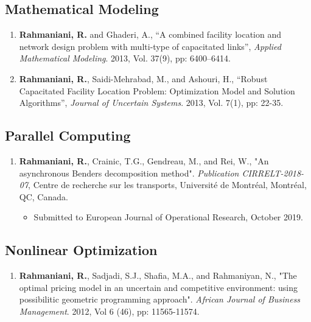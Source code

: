 \documentclass[10PT,letter]{article}
\newcommand{\subsectionstyle}[1]{\normalfont\selectfont\textcolor{titlecol}{\sffamily #1}}
\begin{document}
		\subsection*{\subsectionstyle{Mathematical Modeling}}
			\begin{enumerate}[itemsep=.5mm]
           		 \item 
           		 			\textbf{Rahmaniani, R.} and Ghaderi, A., “A combined facility location and network design problem with multi-type of capacitated links”, \textit{Applied Mathematical Modeling}. 2013, Vol. 37(9), pp: 6400–6414.	
           		 \item
           		 			\textbf{Rahmaniani, R.}, Saidi-Mehrabad, M., and Ashouri, H., “Robust Capacitated Facility Location Problem: Optimization Model and Solution Algorithms”, \textit{Journal of Uncertain Systems}. 2013, Vol. 7(1), pp: 22-35.
       		 \end{enumerate}
		\subsection*{\subsectionstyle{Parallel Computing}}
				\begin{enumerate}[itemsep=.5mm]
					\item 
								\textbf{Rahmaniani, R.}, Crainic, T.G., Gendreau, M., and Rei, W., "An asynchronous Benders decomposition method". \textit{Publication CIRRELT-2018-07}, Centre de recherche sur les transports, Universit\'e de Montr\'eal, Montr\'eal, QC, Canada. 
								\begin{itemize}
									\item Submitted to European Journal of Operational Research, October 2019.
								\end{itemize}
				\end{enumerate}
		\subsection*{\subsectionstyle{Nonlinear Optimization}}
		\begin{enumerate}[itemsep=.5mm]
			\item 
					\textbf{Rahmaniani, R.}, Sadjadi, S.J.,    Shafia, M.A., and Rahmaniyan, N., "The optimal pricing model in an uncertain and competitive environment: using possibilitic geometric programming approach". \textit{African Journal of Business Management}. 2012, Vol 6 (46), pp: 11565-11574.
		\end{enumerate}
	
	
\end{document}
